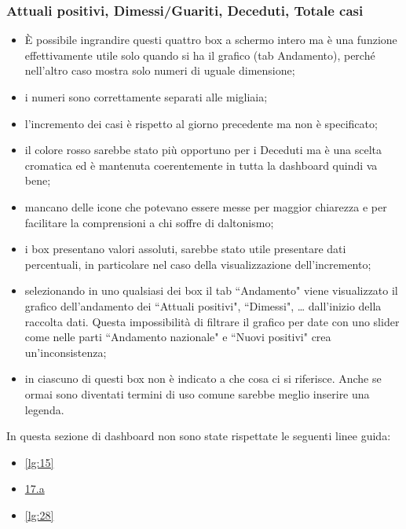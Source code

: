 \subsubsection{Attuali positivi, Dimessi/Guariti, Deceduti, Totale casi}
\label{sss:attuali_positivi-dimessi_guariti-deceduti-totale_casi}
\begin{itemize}
    \item È possibile ingrandire questi quattro box a schermo intero ma è una funzione effettivamente utile solo quando si ha il grafico (tab Andamento), perché nell'altro caso mostra solo numeri di uguale dimensione;
    \item i numeri sono correttamente separati alle migliaia;
    \item l'incremento dei casi è rispetto al giorno precedente ma non è specificato;
    \item il colore rosso sarebbe stato più opportuno per i Deceduti ma è una scelta cromatica ed è mantenuta coerentemente in tutta la dashboard quindi va bene;
    \item mancano delle icone che potevano essere messe per maggior chiarezza e per facilitare la comprensioni a chi soffre di daltonismo;
    \item i box presentano valori assoluti, sarebbe stato utile presentare dati percentuali, in particolare nel caso della visualizzazione dell'incremento;
    \item selezionando in uno qualsiasi dei box il tab ``Andamento" viene visualizzato il grafico dell'andamento dei ``Attuali positivi", ``Dimessi", … dall'inizio della raccolta dati. Questa impossibilità di filtrare il grafico per date con uno slider come nelle parti ``Andamento nazionale" e ``Nuovi positivi" crea un'inconsistenza;
    \item in ciascuno di questi box non è indicato a che cosa ci si riferisce. Anche se ormai sono diventati termini di uso comune sarebbe meglio inserire una legenda.
\end{itemize}
In questa sezione di dashboard non sono state rispettate le seguenti linee guida:
\begin{itemize}
    \item \ref{lg:15}
    \item \hyperref[lg:17.a]{17.a}
    \item \ref{lg:28}
\end{itemize}

